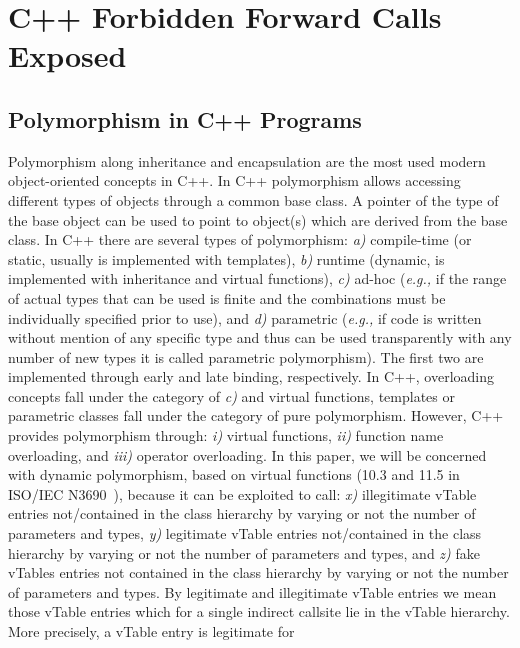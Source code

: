 \section{C++ Forbidden Forward Calls Exposed}
\label{C++ Bad Forward Indirect Calls}

\subsection{Polymorphism in C++ Programs}
\label{Polymorphism in C++}
Polymorphism along inheritance and encapsulation
are the most used modern object-oriented concepts in C++. 
In C++ polymorphism allows accessing different types of objects 
through a common base class. A pointer of the type of the base object
can be used to point to object(s) which are derived from the base class.
In C++ there are several types of polymorphism:
\textit{a)} compile-time (or static, usually is implemented with templates), 
\textit{b)} runtime (dynamic, is implemented with inheritance and virtual functions), 
\textit{c)} ad-hoc (\textit{e.g.,} if the range of actual types that can be used is finite and the combinations must be individually specified prior to use), and
\textit{d)} parametric (\textit{e.g.,} if code is written without mention of any specific type and thus can be used transparently with any number of new types it is called parametric polymorphism). 
The first two are implemented through early 
and late binding, respectively.
In C++, overloading concepts fall under the category of \textit{c)} and virtual functions, templates or parametric classes fall under the category of pure polymorphism.
However, C++ provides polymorphism through: 
\textit{i)} virtual functions,
\textit{ii)} function name overloading, and 
\textit{iii)} operator overloading. 
In this paper, we will be concerned with dynamic polymorphism, based on virtual functions (10.3 and 11.5 in ISO/IEC N3690~\cite{iso:iecN3690}), because it can be exploited to call: 
\textit{x)} illegitimate vTable entries not/contained in the class hierarchy by varying or not the number of parameters and types,
\textit{y)} legitimate vTable entries not/contained in the class hierarchy by varying or not the number of parameters and types, and 
\textit{z)} fake vTables entries not contained in the class hierarchy by varying or not the number of parameters and types.
By legitimate and illegitimate vTable entries we mean those 
vTable entries which for a single indirect callsite lie in the 
vTable hierarchy. More precisely, a vTable entry is legitimate for 
